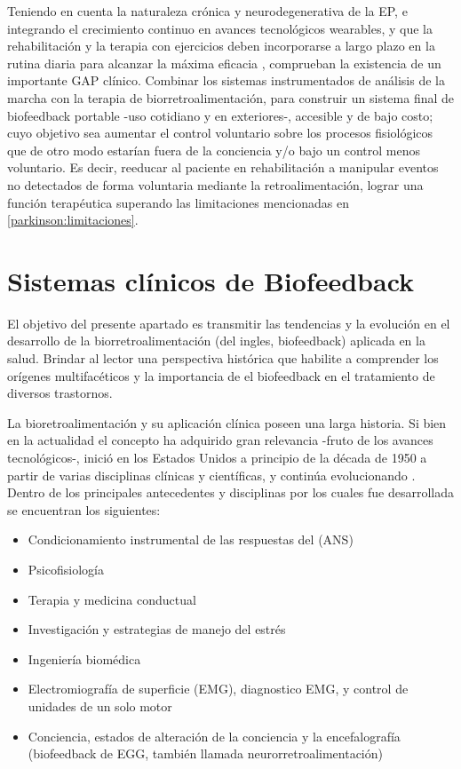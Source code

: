Teniendo en cuenta la naturaleza crónica y neurodegenerativa de la EP, e integrando el crecimiento continuo en avances tecnológicos wearables, y que la rehabilitación y la terapia con ejercicios deben incorporarse a largo plazo en la rutina diaria para alcanzar la máxima eficacia \cite{Tomlinson2012,Lamotte2014}, comprueban la existencia de un importante GAP clínico. Combinar los sistemas instrumentados de análisis de la marcha con la terapia de biorretroalimentación, para construir un sistema final de biofeedback portable -uso cotidiano y en exteriores-, accesible y de bajo costo; cuyo objetivo sea aumentar el control voluntario sobre los procesos fisiológicos que de otro modo estarían fuera de la conciencia y/o bajo un control menos voluntario. Es decir, reeducar al paciente en rehabilitación a manipular eventos no detectados de forma voluntaria mediante la retroalimentación, lograr una función terapéutica superando las limitaciones mencionadas en \ref{parkinson:limitaciones}. 

\section{Sistemas clínicos de Biofeedback}

El objetivo del presente apartado es transmitir las tendencias y la evolución en el desarrollo de la biorretroalimentación (del ingles, \gls{biofeedback}) aplicada en la salud. Brindar al lector una perspectiva histórica que habilite a comprender los orígenes multifacéticos y la importancia de el biofeedback en el tratamiento de diversos trastornos.

La bioretroalimentación y su aplicación clínica poseen una larga historia. Si bien en la actualidad el concepto ha adquirido gran relevancia -fruto de los avances tecnológicos-, inició en los Estados Unidos a principio de la década de 1950 a partir de varias disciplinas clínicas y científicas, y continúa evolucionando \cite{Schwarts4th}. Dentro de los principales antecedentes y disciplinas por los cuales fue desarrollada se encuentran los siguientes:
 \begin{itemize}
    \item Condicionamiento instrumental de las respuestas del (\gls{ANS})
    \item Psicofisiología
    \item Terapia  y medicina conductual
    \item Investigación y estrategias de manejo del estrés
    \item Ingeniería biomédica
    \item Electromiografía de superficie (EMG), diagnostico EMG, y control de unidades de un solo motor
    \item Conciencia, estados de alteración de la conciencia y la encefalografía (biofeedback de EGG, también llamada neurorretroalimentación)
\end{itemize}

